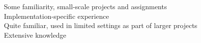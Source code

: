 \documentclass[a4paper,10pt]{article}
\begin{document}
\vspace{1em}

\begin{center}
  \parbox{12cm}{
    \onenote Some familiarity, small-scale projects and assignments \\
    \twonotes Implementation-specific experience \\
    \threenotes Quite familiar, used in limited settings as part of larger projects \\
    \fournotes Extensive knowledge
  }
\end{center}
\end{document}
